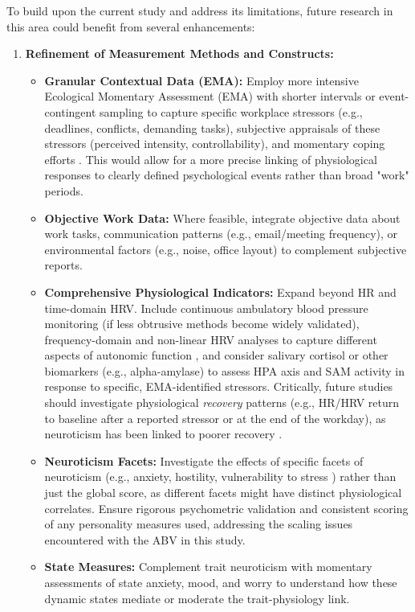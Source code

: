 \documentclass[11pt, a4paper]{report}
\begin{document}
To build upon the current study and address its limitations, future research in this area could benefit from several enhancements:

\begin{enumerate}
    \item \textbf{Refinement of Measurement Methods and Constructs:}
        \begin{itemize}
            \item \textbf{Granular Contextual Data (EMA):} Employ more intensive Ecological Momentary Assessment (EMA) with shorter intervals or event-contingent sampling to capture specific workplace stressors (e.g., deadlines, conflicts, demanding tasks), subjective appraisals of these stressors (perceived intensity, controllability), and momentary coping efforts \cite{ShiffmanEtAl2008}. This would allow for a more precise linking of physiological responses to clearly defined psychological events rather than broad "work" periods.
            \item \textbf{Objective Work Data:} Where feasible, integrate objective data about work tasks, communication patterns (e.g., email/meeting frequency), or environmental factors (e.g., noise, office layout) to complement subjective reports.
            \item \textbf{Comprehensive Physiological Indicators:} Expand beyond HR and time-domain HRV. Include continuous ambulatory blood pressure monitoring (if less obtrusive methods become widely validated), frequency-domain and non-linear HRV analyses to capture different aspects of autonomic function \cite{TaskForce1996}, and consider salivary cortisol or other biomarkers (e.g., alpha-amylase) to assess HPA axis and SAM activity in response to specific, EMA-identified stressors. Critically, future studies should investigate physiological \textit{recovery} patterns (e.g., HR/HRV return to baseline after a reported stressor or at the end of the workday), as neuroticism has been linked to poorer recovery \cite{ChidaHamer2008}.
            \item \textbf{Neuroticism Facets:} Investigate the effects of specific facets of neuroticism (e.g., anxiety, hostility, vulnerability to stress \cite{McCraeCosta1995b}) rather than just the global score, as different facets might have distinct physiological correlates. Ensure rigorous psychometric validation and consistent scoring of any personality measures used, addressing the scaling issues encountered with the ABV in this study.
            \item \textbf{State Measures:} Complement trait neuroticism with momentary assessments of state anxiety, mood, and worry to understand how these dynamic states mediate or moderate the trait-physiology link.

\end{itemize}
\end{enumerate}
\end{document}
